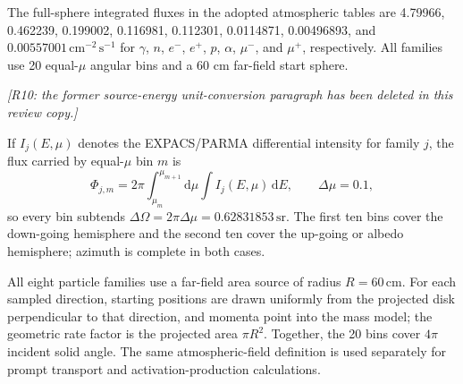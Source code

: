 \documentclass[11pt]{article}
\newcommand{\revdeleted}[1]{\par\noindent\textcolor{revisionblue}{\small\itshape [#1]}\par}
\begin{document}
The full-sphere integrated fluxes in the adopted atmospheric tables are 4.79966, 0.462239, 0.199002,
0.116981, 0.112301, 0.0114871, 0.00496893, and
$0.00557001\,\mathrm{cm^{-2}\,s^{-1}}$ for $\gamma$, $n$, $e^-$, $e^+$, $p$,
$\alpha$, $\mu^-$, and $\mu^+$, respectively. All families use 20 equal-$\mu$
angular bins and a 60 cm far-field start sphere.

\revdeleted{R10: the former source-energy unit-conversion paragraph has been deleted in this review copy.}

If $I_j(E,\mu)$ denotes the EXPACS/PARMA differential intensity for family $j$,
the flux carried by equal-$\mu$ bin $m$ is
\begin{equation}
 \Phi_{j,m}=2\pi\int_{\mu_m}^{\mu_{m+1}}\!\mathrm d\mu
             \int I_j(E,\mu)\,\mathrm dE,
 \qquad \Delta\mu=0.1,
 \label{eq:source_bin_flux}
\end{equation}
so every bin subtends $\Delta\Omega=2\pi\Delta\mu=0.62831853\,\mathrm{sr}$.
The first ten bins cover the down-going hemisphere and the second ten cover the
up-going or albedo hemisphere; azimuth is complete in both cases.

All eight particle families use a far-field area source of radius
$R=60\,\mathrm{cm}$. For each sampled direction, starting positions are drawn
uniformly from the projected disk perpendicular to that direction, and momenta
point into the mass model; the geometric rate factor is the projected area
$\pi R^2$. Together, the 20 bins cover $4\pi$ incident solid angle. The same
atmospheric-field definition is used separately for prompt transport and
activation-production calculations.
\end{document}
